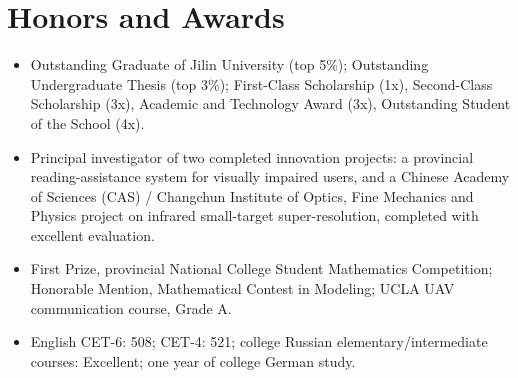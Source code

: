 \documentclass[10pt,letterpaper]{article}
\begin{document}
\section{Honors and Awards}
\begin{itemize}
  \item Outstanding Graduate of Jilin University (top 5\%); Outstanding Undergraduate Thesis (top 3\%); First-Class Scholarship (1x), Second-Class Scholarship (3x), Academic and Technology Award (3x), Outstanding Student of the School (4x).
  \item Principal investigator of two completed innovation projects: a provincial reading-assistance system for visually impaired users, and a Chinese Academy of Sciences (CAS) / Changchun Institute of Optics, Fine Mechanics and Physics project on infrared small-target super-resolution, completed with excellent evaluation.
  \item First Prize, provincial National College Student Mathematics Competition; Honorable Mention, Mathematical Contest in Modeling; UCLA UAV communication course, Grade A.
  \item English CET-6: 508; CET-4: 521; college Russian elementary/intermediate courses: Excellent; one year of college German study.
\end{itemize}
\end{document}
